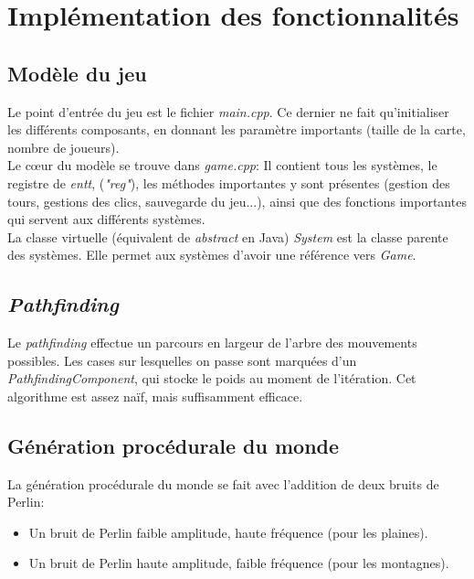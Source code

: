 \documentclass[french]{article}
\begin{document}
\section{Implémentation des fonctionnalités}

\subsection{Modèle du jeu}
Le point d'entrée du jeu est le fichier \textit{main.cpp}. Ce dernier ne fait qu'initialiser les différents composants, en donnant les paramètre importants (taille de la carte, nombre de joueurs).\\

Le cœur du modèle se trouve dans \textit{game.cpp}: Il contient tous les systèmes, le registre de \textit{entt}, (\textit{"reg"}), les méthodes importantes y sont présentes (gestion des tours, gestions des clics, sauvegarde du jeu...), ainsi que des fonctions importantes qui servent aux différents systèmes.\\

La classe virtuelle (équivalent de \textit{abstract} en Java) \textit{System} est la classe parente des systèmes. Elle permet aux systèmes d'avoir une référence vers \textit{Game}.

\subsection{\textit{Pathfinding}}

Le \textit{pathfinding} effectue un parcours en largeur de l'arbre des mouvements possibles. Les cases sur lesquelles on passe sont marquées d'un \textit{PathfindingComponent}, qui stocke le poids au moment de l'itération. Cet algorithme est assez naïf, mais suffisamment efficace. 

\subsection{Génération procédurale du monde}

La génération procédurale du monde se fait avec l'addition de deux bruits de Perlin:
\begin{itemize}
	\item Un bruit de Perlin faible amplitude, haute fréquence (pour les plaines).
	\item Un bruit de Perlin haute amplitude, faible fréquence (pour les montagnes).
\end{itemize}
\end{document}
